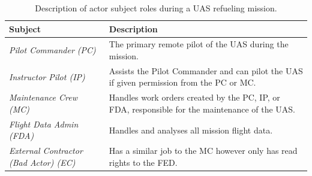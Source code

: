 \documentclass[10pt,journal,compsoc]{IEEEtran}
\begin{document}
\begin{table}[]
  \caption{Description of actor subject roles during a UAS refueling mission.}
  \begin{tabular}{ll}
  \hline
  \textbf{Subject}                           & \textbf{Description}                                                                                       \\ 
  \hline
  \textit{Pilot Commander (PC)}                  & The primary remote pilot of the UAS during the mission.                                                    \\
  \textit{Instructor Pilot (IP)}                 & Assists the Pilot Commander and can pilot the UAS if given permission from the PC or MC.                   \\
  \textit{Maintenance Crew (MC)}                 & Handles work orders created by the PC, IP, or FDA, responsible for the maintenance of the UAS.             \\
  \textit{Flight Data Admin (FDA)}               & Handles and analyses all mission flight data.                                                              \\
  \textit{External Contractor (Bad Actor) (EC)}  & Has a similar job to the MC however only has read rights to the FED.                                       \\
  \end{tabular}
\end{table}
\end{document}
